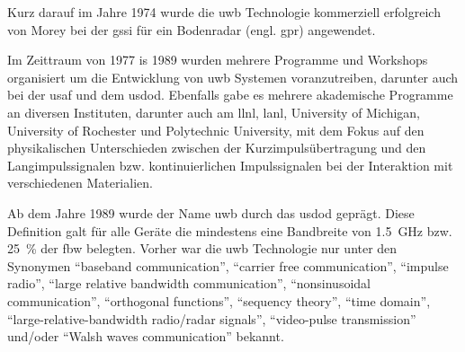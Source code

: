 

Kurz darauf im Jahre 1974 wurde die \ac{uwb} Technologie kommerziell erfolgreich von Morey bei der \ac{gssi} für ein Bodenradar (engl. \acf{gpr}) angewendet. \cite{barrett2001technical}

Im Zeittraum von 1977 is 1989 wurden mehrere Programme und Workshops organisiert um die Entwicklung von \ac{uwb} Systemen voranzutreiben, darunter auch bei der \ac{usaf} und dem \ac{usdod}. Ebenfalls gabe es mehrere akademische Programme an diversen Instituten, darunter auch am \ac{llnl}, \ac{lanl}, University of Michigan, University of Rochester und
Polytechnic University, mit dem Fokus auf den physikalischen Unterschieden zwischen der Kurzimpulsübertragung und den Langimpulssignalen bzw. kontinuierlichen Impulssignalen bei der Interaktion mit verschiedenen Materialien.\cite{barrett2001technical}


Ab dem Jahre 1989 wurde der Name \ac{uwb} durch das \ac{usdod} geprägt. Diese Definition galt für alle Geräte die mindestens eine Bandbreite von \SI{1.5}{\GHz} bzw. \SI{25}{\percent} der \ac{fbw} belegten. Vorher war die \ac{uwb} Technologie nur unter den Synonymen ``baseband communication'', ``carrier free communication'', ``impulse radio'', ``large relative bandwidth communication'', ``nonsinusoidal communication'', ``orthogonal functions'', ``sequency theory'', ``time domain'', ``large-relative-bandwidth radio/radar signals'', ``video-pulse transmission'' und/oder ``Walsh waves communication'' bekannt. \cite{eltaher2004positioning, fowler1990assessment, yang2004uwbcom, aiello2006ultra, fontana2004recent}

